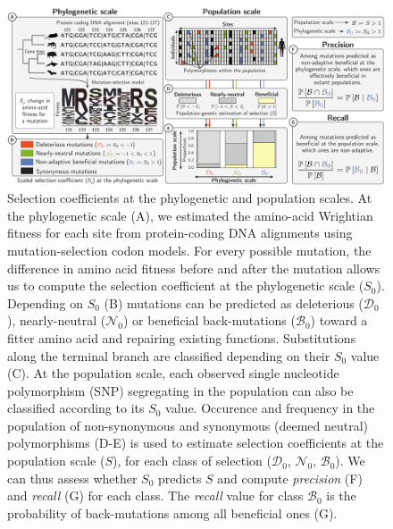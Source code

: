 \documentclass[12pt]{article}
\newcommand{\Sphy}{S_{0}}
\newcommand{\SphyDel}{\mathcal{D}_0}
\newcommand{\SphyNeu}{\mathcal{N}_0}
\newcommand{\SphyBen}{\mathcal{B}_0}
\newcommand{\Spop}{S}
\begin{document}
\begin{figure}[!ht]
    \centering
    \includegraphics[width=\textwidth, page=1] {artworks/figure.method.proba}
    \caption{
        Selection coefficients at the phylogenetic and population scales.
        At the phylogenetic scale (A), we estimated the amino-acid Wrightian fitness for each site from protein-coding DNA alignments using mutation-selection codon models.
        For every possible mutation, the difference in amino acid fitness before and after the mutation allows us to compute the selection coefficient at the phylogenetic scale ($\Sphy$).
        Depending on $\Sphy$ (B) mutations can be predicted as deleterious ($\SphyDel$), nearly-neutral ($\SphyNeu$) or beneficial back-mutations ($\SphyBen$) toward a fitter amino acid and repairing existing functions.
        Substitutions along the terminal branch are classified depending on their $\Sphy$ value (C).
        At the population scale, each observed single nucleotide polymorphism (SNP) segregating in the population can also be classified according to its $\Sphy$ value.
        Occurence and frequency in the population of non-synonymous and synonymous (deemed neutral) polymorphisms (D-E) is used to estimate selection coefficients at the population scale ($\Spop$), for each class of selection ($\SphyDel$, $\SphyNeu$, $\SphyBen$).
        We can thus assess whether $\Sphy$ predicts $\Spop$ and compute \textit{precision} (F) and \textit{recall} (G) for each class.
        The \textit{recall} value for class $\SphyBen$ is the probability of back-mutations among all beneficial ones (G).
    }
    \label{fig:method}
\end{figure}
\end{document}
